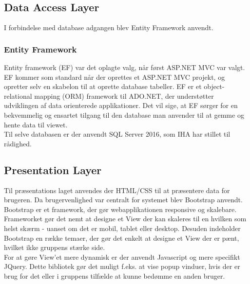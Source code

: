 \subsection{Data Access Layer}
I forbindelse med database adgangen blev Entity Framework anvendt.
 
 \subsubsection{Entity Framework}
Entity framework (EF)\cite{ADOEF} var det oplagte valg, når først ASP.NET MVC var valgt. EF kommer som standard når der oprettes et ASP.NET MVC projekt, og opretter selv en skabelon til at oprette database tabeller. EF er et object-relational mapping (ORM) framework til ADO.NET, der understøtter udviklingen af data orienterede applikationer. Det vil sige, at EF sørger for en bekvemmelig og ensartet tilgang til den database man anvender til at gemme og hente data til viewet. \\
 \noindent Til selve databasen er der anvendt SQL Server 2016, som IHA har stillet til rådighed.
 
\subsection{Presentation Layer}
Til præsentations laget anvendes der HTML/CSS til at præsentere data for brugeren. Da brugervenlighed var centralt for systemet blev Bootstrap\cite{Bootstrap} anvendt. Bootstrap er et framework, der gør webapplikationen responsive og skalebare. Frameworket gør det nemt at designe et View der kan skaleres til en hvilken som helst skærm - uanset om det er mobil, tablet eller desktop. Desuden indeholder Bootstrap en række temaer, der gør det enkelt at designe et View der er pænt, hvilket ikke gruppens stærke side. \\
For at gøre View'et mere dynamisk er der anvendt Javascript og mere specifikt JQuery\cite{jQuery}. 
Dette bibliotek gør det muligt f.eks. at vise popup vinduer, hvis der er brug for det eller i gruppens tilfælde at kunne bedømme en anden bruger.